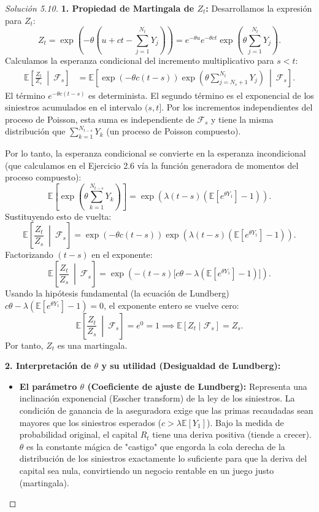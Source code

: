 \documentclass[10pt,a4paper]{article}
\begin{document}
\begin{proof}[Solución  5.10]
    \textbf{1. Propiedad de Martingala de $Z_t$:}
    Desarrollamos la expresión para $Z_t$:
    \[ Z_t = \exp\left(-\theta \left( u + ct - \sum_{j=1}^{N_t} Y_j \right)\right) = e^{-\theta u} e^{-\theta c t} \exp\left( \theta \sum_{j=1}^{N_t} Y_j \right). \]
    Calculamos la esperanza condicional del incremento multiplicativo para $s < t$:
    \begin{align*}
        \mathbb{E} \left[ \frac{Z_t}{Z_s} \ \middle| \ \mathcal{F}_s \right] &= \mathbb{E} \left[ \exp(-\theta c (t-s)) \exp\left( \theta \sum_{j=N_s+1}^{N_t} Y_j \right) \ \middle| \ \mathcal{F}_s \right].
    \end{align*}
    El término $e^{-\theta c (t-s)}$ es determinista. El segundo término es el exponencial de los siniestros acumulados en el intervalo $(s, t]$. Por los incrementos independientes del proceso de Poisson, esta suma es independiente de $\mathcal{F}_s$ y tiene la misma distribución que $\sum_{k=1}^{N_{t-s}} Y_k$ (un proceso de Poisson compuesto).
    
    Por lo tanto, la esperanza condicional se convierte en la esperanza incondicional (que calculamos en el Ejercicio 2.6 vía la función generadora de momentos del proceso compuesto):
    \[ \mathbb{E} \left[ \exp\left( \theta \sum_{k=1}^{N_{t-s}} Y_k \right) \right] = \exp \left( \lambda(t-s) \left( \mathbb{E}[e^{\theta Y_1}] - 1 \right) \right). \]
    Sustituyendo esto de vuelta:
    \[ \mathbb{E} \left[ \frac{Z_t}{Z_s} \ \middle| \ \mathcal{F}_s \right] = \exp(-\theta c (t-s)) \exp \left( \lambda(t-s) \left( \mathbb{E}[e^{\theta Y_1}] - 1 \right) \right). \]
    Factorizando $(t-s)$ en el exponente:
    \[ \mathbb{E} \left[ \frac{Z_t}{Z_s} \ \middle| \ \mathcal{F}_s \right] = \exp \left( -(t-s) \Big[ c\theta - \lambda \left( \mathbb{E}[e^{\theta Y_1}] - 1 \right) \Big] \right). \]
    Usando la hipótesis fundamental (la ecuación de Lundberg) $c\theta - \lambda(\mathbb{E}[e^{\theta Y_1}] - 1) = 0$, el exponente entero se vuelve cero:
    \[ \mathbb{E} \left[ \frac{Z_t}{Z_s} \ \middle| \ \mathcal{F}_s \right] = e^0 = 1 \implies \mathbb{E}[Z_t \mid \mathcal{F}_s] = Z_s. \]
    Por tanto, $Z_t$ es una martingala.

    \textbf{2. Interpretación de $\theta$ y su utilidad (Desigualdad de Lundberg):}
    \begin{itemize}
        \item \textbf{El parámetro $\theta$ (Coeficiente de ajuste de Lundberg):} Representa una inclinación exponencial (Esscher transform) de la ley de los siniestros. La condición de ganancia de la aseguradora exige que las primas recaudadas sean mayores que los siniestros esperados ($c > \lambda \mathbb{E}[Y_1]$). Bajo la medida de probabilidad original, el capital $R_t$ tiene una deriva positiva (tiende a crecer). $\theta$ es la constante mágica de "castigo" que engorda la cola derecha de la distribución de los siniestros exactamente lo suficiente para que la deriva del capital sea nula, convirtiendo un negocio rentable en un juego justo (martingala).
        

\end{itemize}
\end{proof}
\end{document}
